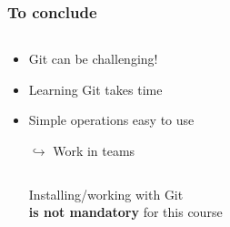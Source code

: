 \documentclass[xcolor=x11names,compress]{beamer}
\renewcommand{\(}{\begin{columns}}
\renewcommand{\)}{\end{columns}}
\newcommand{\<}[1]{\begin{column}{#1}}
\renewcommand{\>}{\end{column}}
\begin{document}
\begin{frame}
\frametitle{To conclude}
\begin{columns}[t]
 \begin{column}{0.5\textwidth}
    \begin{itemize}[<+->]
    \item Git can be challenging!
    \item Learning Git takes time
    \item Simple operations easy to use
    \item[$\hookrightarrow$] Work in teams

    \end{itemize}
 \end{column}
 \begin{column}{0.5\textwidth}
    \begin{itemize}
    \item[]
    \end{itemize}
 \end{column}
\end{columns}
 \begin{itemize}[<+->]
 \item[]
    \item[]
    \begin{center}
    Installing/working with Git \\
     \textbf{is not mandatory} for this course
    \end{center}
  \end{itemize}
\end{frame}
\end{document}
